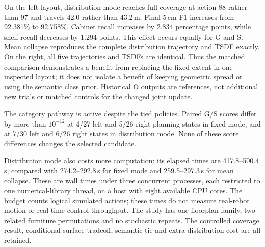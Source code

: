 On the left layout, distribution mode reaches full coverage at action 88
rather than 97 and travels 42.0 rather than 43.2\,m. Final 5\,cm F1 increases
from 92.381\% to 92.758\%. Cabinet recall increases by 2.834 percentage
points, while shelf recall decreases by 1.294 points. This effect occurs
equally for G and S. Mean collapse reproduces the complete distribution
trajectory and TSDF exactly. On the right, all five trajectories and TSDFs
are identical. Thus the matched comparison demonstrates a benefit from
replacing the fixed extent in one inspected layout; it does not isolate a
benefit of keeping geometric spread or using the semantic class prior.
Historical O outputs are references, not additional new trials or matched
controls for the changed joint update.

The category pathway is active despite the tied policies. Paired G/S scores
differ by more than $10^{-12}$ at 4/27 left and 5/26 right planning states in
fixed mode, and at 7/30 left and 6/26 right states in distribution mode.
None of these score differences changes the selected candidate.

Distribution mode also costs more computation: its elapsed times are
417.8--500.4\,s, compared with 274.2--292.8\,s for fixed mode and
259.5--297.3\,s for mean collapse. These are wall times under three concurrent
processes, each restricted to one numerical-library thread, on a host with
eight available CPU cores. The budget counts logical simulated actions;
these times do not measure real-robot motion or real-time control throughput.
The study has one floorplan family, two related furniture permutations and
no stochastic repeats. The controlled coverage result, conditional surface
tradeoff, semantic tie and extra distribution cost are all retained.



